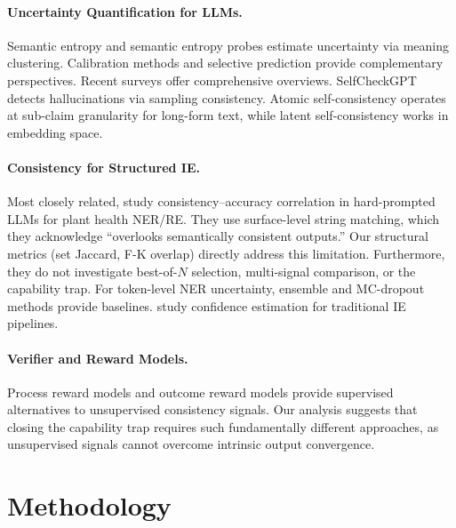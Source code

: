\documentclass[11pt,twocolumn]{article}
\begin{document}
\paragraph{Uncertainty Quantification for LLMs.}
Semantic entropy \citep{kuhn2023semantic} and semantic entropy probes \citep{kossen2024semantic} estimate uncertainty via meaning clustering.
Calibration methods \citep{guo2017calibration,kadavath2022language,desai2020calibration} and selective prediction \citep{geifman2017selective,whitehead2025know} provide complementary perspectives.
Recent surveys \citep{ye2025uq,huang2025uqcalibration,chen2024confidence} offer comprehensive overviews.
SelfCheckGPT \citep{manakul2023selfcheckgpt} detects hallucinations via sampling consistency.
Atomic self-consistency \citep{li2024atomic} operates at sub-claim granularity for long-form text, while latent self-consistency \citep{chen2025latent} works in embedding space.

\paragraph{Consistency for Structured IE.}
Most closely related, \citet{nedellec2026consistency} study consistency--accuracy correlation in hard-prompted LLMs for plant health NER/RE.
They use surface-level string matching, which they acknowledge ``overlooks semantically consistent outputs.''
Our structural metrics (set Jaccard, F-K overlap) directly address this limitation.
Furthermore, they do not investigate best-of-$N$ selection, multi-signal comparison, or the capability trap.
For token-level NER uncertainty, ensemble and MC-dropout methods \citep{lakshminarayanan2017simple,gal2016dropout,xiao2019quantifying,shelmanov2021certain} provide baselines.
\citet{culotta2004confidence} study confidence estimation for traditional IE pipelines.

\paragraph{Verifier and Reward Models.}
Process reward models \citep{lightman2023lets} and outcome reward models \citep{cobbe2021training} provide supervised alternatives to unsupervised consistency signals.
Our analysis suggests that closing the capability trap requires such fundamentally different approaches, as unsupervised signals cannot overcome intrinsic output convergence.

\section{Methodology}
\label{sec:method}
\end{document}
